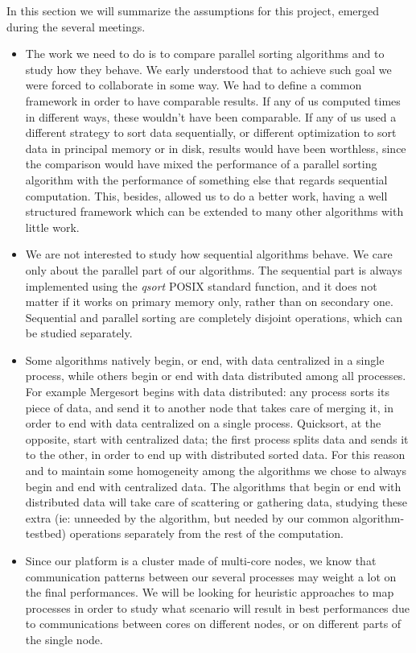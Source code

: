 In this section we will summarize the assumptions for this project, emerged during the several meetings.
\begin{itemize}
	\item{The work we need to do is to compare parallel sorting algorithms and to study how they behave. We early understood that to achieve such goal we were forced to collaborate in some way. We had to define a common framework in order to have comparable results. If any of us computed times in different ways, these wouldn't have been comparable. If any of us used a different strategy to sort data sequentially, or different optimization to sort data in principal memory or in disk, results would have been worthless, since the comparison would have mixed the performance of a parallel sorting algorithm with the performance of something else that regards sequential computation. This, besides, allowed us to do a better work, having a well structured framework which can be extended to many other algorithms with little work.}
	\item{We are not interested to study how sequential algorithms behave. We care only about the parallel part of our algorithms. The sequential part is always implemented using the \textit{qsort} POSIX standard function, and it does not matter if it works on primary memory only, rather than on secondary one. Sequential and parallel sorting are completely disjoint operations, which can be studied separately.}
	\item{Some algorithms natively begin, or end, with data centralized in a single process, while others begin or end with data distributed among all processes. For example Mergesort begins with data distributed: any process sorts its piece of data, and send it to another node that takes care of merging it, in order to end with data centralized on a single process. Quicksort, at the opposite, start with centralized data; the first process splits data and sends it to the other, in order to end up with distributed sorted data. For this reason and to maintain some homogeneity among the algorithms we chose to always begin and end with centralized data. The algorithms that begin or end with distributed data will take care of scattering or gathering data, studying these extra (ie: unneeded by the algorithm, but needed by our common algorithm-testbed) operations separately from the rest of the computation.}
	\item{Since our platform is a cluster made of multi-core nodes, we know that communication patterns between our several processes may weight a lot on the final performances. We will be looking for heuristic approaches to map processes in order to study what scenario will result in best performances due to communications between cores on different nodes, or on different parts of the single node.}
\end{itemize}
